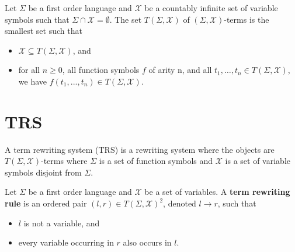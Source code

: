 \documentclass{book}
\begin{document}
\begin{definition}
  Let $\Sigma$ be a first order language and $\mathcal{X}$ be a countably infinite set of variable symbols such that $\Sigma \cap \mathcal{X} = \emptyset$. The set $T(\Sigma,\mathcal{X})$ of $(\Sigma,\mathcal{X})$-terms is the smallest set such that 
  \begin{itemize}
  \item $\mathcal{X} \subseteq T(\Sigma,\mathcal{X})$, and
  \item for all $n\geq 0$, all function symbols $f$ of arity n, and all $t_1,\hdots, t_n \in T(\Sigma, \mathcal{X})$, we have $f(t_1,...,t_n) \in T(\Sigma, \mathcal{X})$.
  \end{itemize}
\end{definition}



\section{TRS}
A term rewriting system (TRS) is a rewriting system where the objects are $T(\Sigma,\mathcal{X})$-terms where $\Sigma$ is a set of function symbols and $\mathcal{X}$ is a set of variable symbols disjoint from $\Sigma$.
  
\begin{definition}
    Let $\Sigma$ be a first order language and $\mathcal{X}$ be a set of variables. A \textbf{term rewriting rule} is an ordered pair $(l,r) \in T(\Sigma, \mathcal{X})^2$, denoted $l \to r$, such that
    \begin{itemize}
      \item $l$ is not a variable, and
      \item every variable occurring in $r$ also occurs in $l$.
    \end{itemize}
  \end{definition}
  
\end{document}
